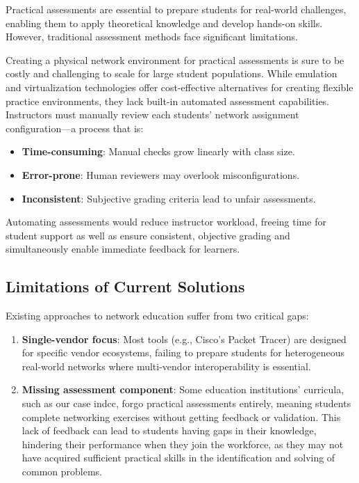   Practical assessments are essential to prepare students for real-world challenges, enabling them to apply 
  theoretical knowledge and develop hands-on skills. However, traditional assessment methods face significant limitations.

  Creating a physical network environment for practical assessments is sure to be costly and challenging to scale for 
  large student populations. 
  While emulation and virtualization technologies offer cost-effective alternatives for creating flexible practice environments, 
  they lack built-in automated assessment capabilities. 
  Instructors must manually review each students' network assignment configuration—a process that is:

  \begin{itemize}
    \item \textbf{Time-consuming}: Manual checks grow linearly with class size.
    \item \textbf{Error-prone}: Human reviewers may overlook misconfigurations.
    \item \textbf{Inconsistent}: Subjective grading criteria lead to unfair assessments.
  \end{itemize}

  Automating assessments would reduce instructor workload, freeing time for student support as well as ensure consistent, objective grading 
  and simultaneously enable immediate feedback for learners.

  \subsection{Limitations of Current Solutions}

    Existing approaches to network education suffer from two critical gaps:

    \begin{enumerate}
        \item \textbf{Single-vendor focus}: Most tools (e.g., Cisco's Packet Tracer) are designed for specific vendor ecosystems, failing 
        to prepare students for heterogeneous real-world networks where multi-vendor interoperability is essential.
        \item \textbf{Missing assessment component}: Some education institutions' curricula, such as our case in\ac{dcc}, forgo practical 
        assessments entirely, meaning students complete networking exercises without getting feedback or validation. This lack of feedback 
        can lead to students having gaps in their knowledge, hindering their performance when they join the workforce, as they may not have 
        acquired sufficient practical skills in the identification and solving of common problems.
    \end{enumerate}


